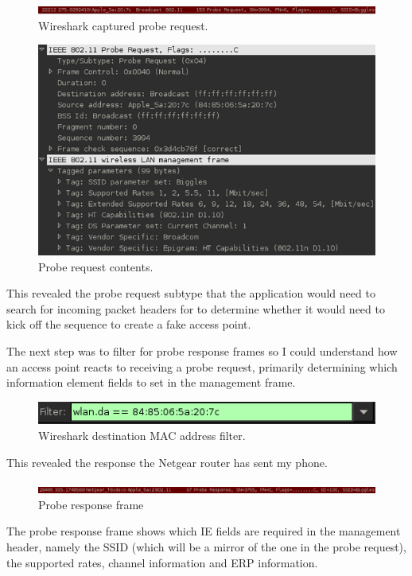 \begin{figure}[h!]
\includegraphics[width=\linewidth]{research/80211/figures/bt3.png}
\caption{Wireshark captured probe request.}
\label{research:80211:bt3}
\end{figure}

\begin{figure}[h!]
\includegraphics[width=\linewidth]{research/80211/figures/bt4.png}
\caption{Probe request contents.}
\label{research:80211:bt4}
\end{figure}
\newpage
This revealed the probe request subtype that the application would need to search for incoming packet headers for to determine whether it would need to kick off the sequence to create a fake access point.

The next step was to filter for probe response frames so I could understand how an access point reacts to receiving a probe request, primarily determining which information element fields to set in the management frame.

\begin{figure}[h!]
\includegraphics[width=\linewidth]{research/80211/figures/bt5.png}
\caption{Wireshark destination MAC address filter.}
\label{research:80211:bt5}
\end{figure}

This revealed the response the Netgear router has sent my phone.

\begin{figure}[h!]
\includegraphics[width=\linewidth]{research/80211/figures/bt6.png}
\caption{Probe response frame}
\label{research:80211:bt6}
\end{figure}
\newpage
The probe response frame shows which IE fields are required in the management header, namely the SSID (which will be a mirror of the one in the probe request), the supported rates, channel information and ERP information. 

